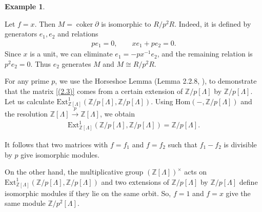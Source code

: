 \documentclass[sn-mathphys-num]{sn-jnl}
\theoremstyle{definition}
\newtheorem{example}[lemma]{Example}
\numberwithin{equation}{section}
\theoremstyle{definition}
\def\pd{\partial}
\def\IZ{{\mathbb{Z}}}
\def\coker{\operatorname{coker}}
\begin{document}
\begin{example}\label{example:f_inv}

Let $f=x$. Then $M=\coker\pd$ is isomorphic to $R/p^2R$. Indeed, it is defined by generators $e_1,e_2$ and relations \begin{align} pe_1=0, \qquad xe_1+pe_2=0. \end{align} Since $x$ is a unit, we can eliminate $e_1=-px^{-1}e_2$, and the remaining relation is $p^2e_2=0$. Thus $e_2$ generates $M$ and $M\cong R/p^2R$.

For any prime $p$, we use the Horseshoe Lemma (Lemma 2.2.8, \cite{weibel1994introduction}), to demonstrate that the  matrix \eqref{(2.3)} comes from a certain extension  of $\mathbb{Z}/p[\Lambda]$ by $\mathbb{Z}/p[\Lambda]$.   Let us calculate $\text{Ext}^1_{\mathbb{Z}[\Lambda]}(\mathbb{Z}/p[\Lambda], \mathbb{Z}/p[\Lambda])$. Using $\text{Hom}(- , \mathbb{Z}/p[\Lambda])$ and the resolution $\mathbb{Z}[\Lambda] \xrightarrow{p} \mathbb{Z}[\Lambda]$, we obtain 
\begin{align}
    \text{Ext}^1_{\mathbb{Z}[\Lambda]}(\mathbb{Z}/p[\Lambda], \mathbb{Z}/p[\Lambda]) = \mathbb{Z}/p[\Lambda]. 
    \end{align} 
    
It follows that two matrices with $f=f_1$ and $f=f_2$ such that $f_1-f_2$ is divisible by $p$ give isomorphic modules. 

 On the other hand,  the multiplicative group $(\mathbb{Z}[\Lambda])^{\times}$ acts on  $ \text{Ext}^1_{\mathbb{Z}[\Lambda]}(\mathbb{Z}/p[\Lambda], \mathbb{Z}/p[\Lambda])$ and two extensions of $\mathbb{Z}/p[\Lambda]$ by $\mathbb{Z}/p[\Lambda]$  define isomorphic modules if they lie on the same orbit. So,  $f=1$ and $f=x $ give the same module $\IZ/p^2[\Lambda]$.

\end{example}
 \vspace{3mm}
\end{document}
